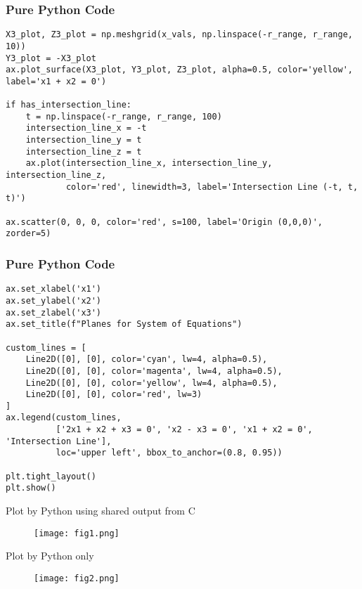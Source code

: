 \documentclass{beamer}
\begin{document}
\begin{frame}[fragile]
\frametitle{Pure Python Code}
\begin{lstlisting}
X3_plot, Z3_plot = np.meshgrid(x_vals, np.linspace(-r_range, r_range, 10))
Y3_plot = -X3_plot
ax.plot_surface(X3_plot, Y3_plot, Z3_plot, alpha=0.5, color='yellow', label='x1 + x2 = 0')

if has_intersection_line:
    t = np.linspace(-r_range, r_range, 100)
    intersection_line_x = -t
    intersection_line_y = t
    intersection_line_z = t
    ax.plot(intersection_line_x, intersection_line_y, intersection_line_z,
            color='red', linewidth=3, label='Intersection Line (-t, t, t)')

ax.scatter(0, 0, 0, color='red', s=100, label='Origin (0,0,0)', zorder=5)
\end{lstlisting}
\end{frame}

\begin{frame}[fragile]
\frametitle{Pure Python Code}
\begin{lstlisting}
ax.set_xlabel('x1')
ax.set_ylabel('x2')
ax.set_zlabel('x3')
ax.set_title(f"Planes for System of Equations")

custom_lines = [
    Line2D([0], [0], color='cyan', lw=4, alpha=0.5),
    Line2D([0], [0], color='magenta', lw=4, alpha=0.5),
    Line2D([0], [0], color='yellow', lw=4, alpha=0.5),
    Line2D([0], [0], color='red', lw=3)
]
ax.legend(custom_lines,
          ['2x1 + x2 + x3 = 0', 'x2 - x3 = 0', 'x1 + x2 = 0', 'Intersection Line'],
          loc='upper left', bbox_to_anchor=(0.8, 0.95))

plt.tight_layout()
plt.show()
\end{lstlisting}
\end{frame}

\begin{frame}{Plot by Python using shared output from C}
\begin{figure}[H]
        \centering
        \texttt{[image: fig1.png]}
        \caption{}
        \label{fig:1}
    \end{figure}
\end{frame}

 \begin{frame}{Plot by Python only}
\begin{figure}[H]
        \centering
        \texttt{[image: fig2.png]}
        \caption{}
        \label{fig:2}
    \end{figure}
\end{frame}
\end{document}
